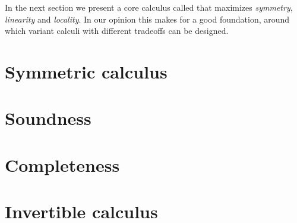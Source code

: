 In the next section we present a core calculus called  that
maximizes \emph{symmetry}, \emph{linearity} and \emph{locality}. In our opinion
this makes for a good  foundation, around which variant
calculi with different tradeoffs can be designed.


\section{Symmetric calculus}



\section{Soundness}



\section{Completeness}



\section{Invertible calculus}





%   



